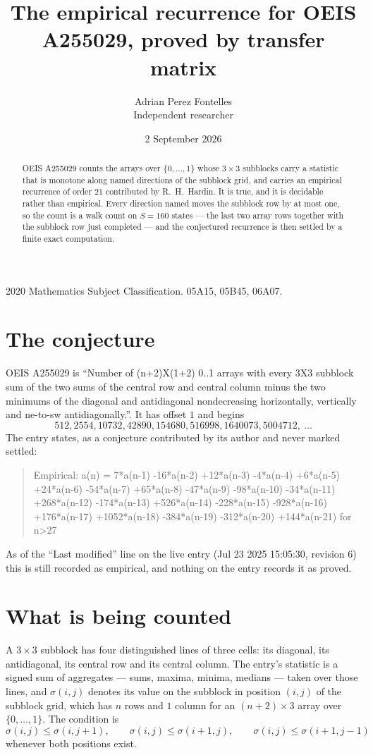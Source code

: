 \documentclass[11pt,a4paper]{article}
\title{The empirical recurrence for OEIS A255029, proved by transfer matrix}
\author{Adrian Perez Fontelles\\ \small Independent researcher}
\date{2 September 2026}
\theoremstyle{plain}
\theoremstyle{definition}
\begin{document}
\maketitle

\begin{abstract}
OEIS A255029 counts the arrays over $\{0,\dots,1\}$ whose $3\times3$ subblocks carry a
statistic that is monotone along named directions of the subblock grid, and carries an
empirical recurrence of order $21$ contributed by R.~H.~Hardin. It is true, and it is
decidable rather than empirical. Every direction named moves the subblock row by at most one,
so the count is a walk count on $S=160$ states --- the last two array rows together with the
subblock row just completed --- and the conjectured recurrence is then settled by a finite
exact computation.
\end{abstract}

\noindent\small 2020 Mathematics Subject Classification. 05A15, 05B45, 06A07.\normalsize

\section{The conjecture}

OEIS A255029 is ``Number of (n+2)X(1+2) 0..1 arrays with every 3X3 subblock sum of the two sums of the central row and central column minus the two minimums of the diagonal and antidiagonal nondecreasing horizontally, vertically and ne-to-sw antidiagonally.''. It has offset $1$ and begins
\[
512, 2554, 10732, 42890, 154680, 516998, 1640073, 5004712,\ \dots
\]
The entry states, as a conjecture contributed by its author and never marked settled:
\begin{quote}
Empirical: a(n) = 7*a(n-1) -16*a(n-2) +12*a(n-3) -4*a(n-4) +6*a(n-5) +24*a(n-6) -54*a(n-7) +65*a(n-8) -47*a(n-9) -98*a(n-10) -34*a(n-11) +268*a(n-12) -174*a(n-13) +526*a(n-14) -228*a(n-15) -928*a(n-16) +176*a(n-17) +1052*a(n-18) -384*a(n-19) -312*a(n-20) +144*a(n-21) for n>27
\end{quote}
As of the ``Last modified'' line on the live entry (Jul 23 2025 15:05:30, revision 6) this is still
recorded as empirical, and nothing on the entry records it as proved.

\section{What is being counted}

A $3\times3$ subblock has four distinguished lines of three cells: its diagonal, its
antidiagonal, its central row and its central column. The entry's statistic is a signed sum of
aggregates --- sums, maxima, minima, medians --- taken over those lines, and $\sigma(i,j)$
denotes its value on the subblock in position $(i,j)$ of the subblock grid, which has $n$ rows
and $1$ column for an $(n+2)\times3$ array over $\{0,\dots,1\}$. The condition is
\[
\sigma(i,j)\le\sigma(i,j+1),\qquad \sigma(i,j)\le\sigma(i+1,j),\qquad \sigma(i,j)\le\sigma(i+1,j-1)
\]
whenever both positions exist.
\end{document}

